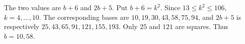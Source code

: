 The two values are $b+6$ and $2b+5$. Put $b+6=k^2$. Since $13\le k^2\le106$, $k=4,\ldots,10$. The corresponding bases are $10,19,30,43,58,75,94$, and $2b+5$ is respectively $25,43,65,91,121,155,193$. Only $25$ and $121$ are squares. Thus $\boxed{b=10,58}$.

